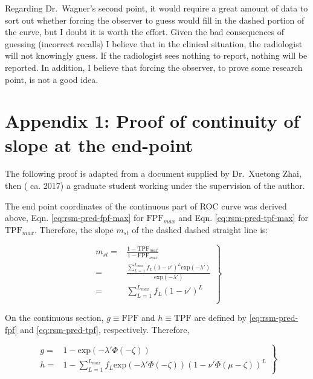 \documentclass[
]{book}
\begin{document}
Regarding Dr.~Wagner's second point, it would require a great amount of data to sort out whether forcing the observer to guess would fill in the dashed portion of the curve, but I doubt it is worth the effort. Given the bad consequences of guessing (incorrect recalls) I believe that in the clinical situation, the radiologist will not knowingly guess. If the radiologist sees nothing to report, nothing will be reported. In addition, I believe that forcing the observer, to prove some research point, is not a good idea.

\hypertarget{rsm-pred-appendix1}{%
\section{Appendix 1: Proof of continuity of slope at the end-point}\label{rsm-pred-appendix1}}

The following proof is adapted from a document supplied by Dr.~Xuetong Zhai, then ( ca. 2017) a graduate student working under the supervision of the author.

The end point coordinates of the continuous part of ROC curve was derived above, Eqn. \eqref{eq:rsm-pred-fpf-max} for \(\text{FPF}_{max}\) and Eqn. \eqref{eq:rsm-pred-tpf-max} for \(\text{TPF}_{max}\). Therefore, the slope \(m_{st}\) of the dashed dashed straight line is:

\begin{equation}
\left. 
\begin{aligned}
m_{st} =& \frac{1-\text{TPF}_{max}}{1-\text{FPF}_{max}}\\
=&\frac{\sum_{L=1}^{L_{max}} f_L \left ( 1 - \nu' \right )^L
 \text{exp} \left ( - \lambda' \right )} {\text{exp} \left ( - \lambda' \right )} \\
=& \sum_{L=1}^{L_{max}} f_L \left ( 1 - \nu' \right )^L  \\
\end{aligned}
\right \}
\label{eq:rsm-slope-st-line}
\end{equation}

On the continuous section, \(g\equiv\text{FPF}\) and \(h\equiv\text{TPF}\) are defined by \eqref{eq:rsm-pred-fpf} and \eqref{eq:rsm-pred-tpf}, respectively. Therefore,

\begin{equation}
\left. 
\begin{aligned}
g =& 1-\text{exp} \left ( -\lambda' \Phi\left ( -\zeta \right ) \right ) \\
h =& 1-\sum_{L=1}^{L_{max}}f_L \text{exp} \left ( -\lambda' \Phi\left ( -\zeta \right ) \right ) \left ( 1-\nu'\Phi\left ( \mu - \zeta \right ) \right )^{L}
\end{aligned}
\right \}
\label{eq:rsm-pred-slope-eq3}
\end{equation}
\end{document}
